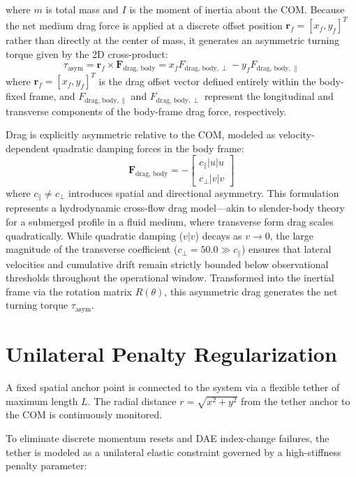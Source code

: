 \documentclass[11pt,aip,reprint,superscriptaddress]{revtex4-2}
\begin{document}
where \(m\) is total mass and \(I\) is the moment of inertia about the COM. Because the net medium drag force is applied at a discrete offset position \(\mathbf{r}_f = [x_f, y_f]^T\) rather than directly at the center of mass, it generates an asymmetric turning torque given by the 2D cross-product:
\begin{equation}
\tau_{\text{asym}} = \mathbf{r}_f \times \mathbf{F}_{\text{drag, body}} = x_f F_{\text{drag, body}, \perp} - y_f F_{\text{drag, body}, \parallel}
\end{equation}
where $\mathbf{r}_f = [x_f, y_f]^T$ is the drag offset vector defined entirely within the body-fixed frame, and $F_{\text{drag, body}, \parallel}$ and $F_{\text{drag, body}, \perp}$ represent the longitudinal and transverse components of the body-frame drag force, respectively.

Drag is explicitly asymmetric relative to the COM, modeled as velocity-dependent quadratic damping forces in the body frame:
\begin{equation}
\mathbf{F}_{\text{drag, body}} = - \begin{bmatrix} c_{\parallel} |u| u \\ c_{\perp} |v| v \end{bmatrix}
\end{equation}
where \(c_{\parallel} \neq c_{\perp}\) introduces spatial and directional asymmetry. This formulation represents a hydrodynamic cross-flow drag model—akin to slender-body theory for a submerged profile in a fluid medium, where transverse form drag scales quadratically. While quadratic damping (\(v|v\)) decays as \(v \to 0\), the large magnitude of the transverse coefficient (\(c_{\perp} = 50.0 \gg c_{\parallel}\)) ensures that lateral velocities and cumulative drift remain strictly bounded below observational thresholds throughout the operational window. Transformed into the inertial frame via the rotation matrix \(R(\theta)\), this asymmetric drag generates the net turning torque \(\tau_{\text{asym}}\).

\section{Unilateral Penalty Regularization}

A fixed spatial anchor point is connected to the system via a flexible tether of maximum length \(L\). The radial distance \(r = \sqrt{x^2 + y^2}\) from the tether anchor to the COM is continuously monitored.

To eliminate discrete momentum resets and DAE index-change failures, the tether is modeled as a unilateral elastic constraint governed by a high-stiffness penalty parameter:
\end{document}
